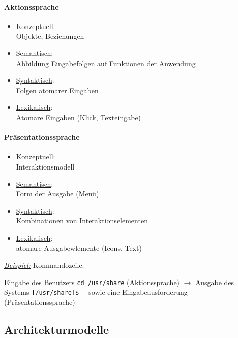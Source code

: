 \documentclass
[
	8pt,		%
	ngerman,	%
	a4paper,	%
	landscape,	%
	final		%
]{extarticle}
\newcommand{\example}{\textit{\underline{Beispiel:} }}
\begin{document}
\begin{multicols*}{4}
{\begin{multicols*}{2}
			\paragraph{Aktionssprache}
			\begin{itemize}
				\item \underline{Konzeptuell}:\\
				      Objekte, Beziehungen
				\item \underline{Semantisch}:\\
				      Abbildung Eingabefolgen auf Funktionen der Anwendung
				\item \underline{Syntaktisch}:\\
				      Folgen atomarer Eingaben
				\item \underline{Lexikalisch}:\\
				      Atomare Eingaben (Klick, Texteingabe)
			\end{itemize}
			\columnbreak
			\paragraph{Präsentationssprache}
			\begin{itemize}
				\item \underline{Konzeptuell}:\\
				      Interaktionsmodell
				\item \underline{Semantisch}:\\
				      Form der Ausgabe (Menü)
				\item \underline{Syntaktisch}:\\
				      Kombinationen von Interaktionselementen
				\item \underline{Lexikalisch}:\\
				      atomare Ausgabewlemente (Icons, Text)
			\end{itemize}
		\end{multicols*}
	}
	\example Kommandozeile: \par
	Eingabe des Benutzers \texttt{cd /usr/share} (Aktionssprache) \(\rightarrow\)
	Ausgabe des Systems \texttt{[/usr/share]\$ \_} sowie eine
	Eingabeausforderung (Präsentationssprache)
	\subsection{Architekturmodelle}

\end{multicols*}
\end{document}
